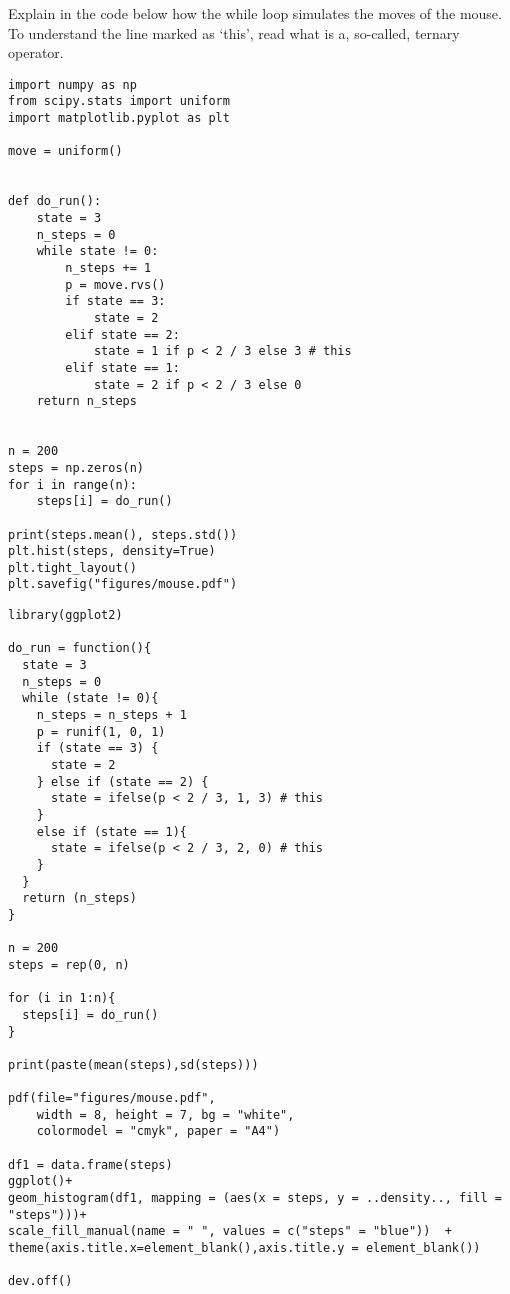 \begin{exercise}
Explain in the code below how the while loop simulates the moves of the mouse.  To understand the line marked as `this', read what is a, so-called, ternary operator.
\begin{verbatim}
import numpy as np
from scipy.stats import uniform
import matplotlib.pyplot as plt

move = uniform()


def do_run():
    state = 3
    n_steps = 0
    while state != 0:
        n_steps += 1
        p = move.rvs()
        if state == 3:
            state = 2
        elif state == 2:
            state = 1 if p < 2 / 3 else 3 # this
        elif state == 1:
            state = 2 if p < 2 / 3 else 0
    return n_steps


n = 200
steps = np.zeros(n)
for i in range(n):
    steps[i] = do_run()

print(steps.mean(), steps.std())
plt.hist(steps, density=True)
plt.tight_layout()
plt.savefig("figures/mouse.pdf")
\end{verbatim}

\begin{verbatim}
library(ggplot2)

do_run = function(){
  state = 3
  n_steps = 0
  while (state != 0){
    n_steps = n_steps + 1
    p = runif(1, 0, 1)
    if (state == 3) {
      state = 2
    } else if (state == 2) {
      state = ifelse(p < 2 / 3, 1, 3) # this
    }
    else if (state == 1){
      state = ifelse(p < 2 / 3, 2, 0) # this
    }
  }
  return (n_steps)
}

n = 200
steps = rep(0, n)

for (i in 1:n){
  steps[i] = do_run()
}

print(paste(mean(steps),sd(steps)))

pdf(file="figures/mouse.pdf",
    width = 8, height = 7, bg = "white",
    colormodel = "cmyk", paper = "A4")

df1 = data.frame(steps)
ggplot()+
geom_histogram(df1, mapping = (aes(x = steps, y = ..density.., fill = "steps")))+
scale_fill_manual(name = " ", values = c("steps" = "blue"))  +
theme(axis.title.x=element_blank(),axis.title.y = element_blank())

dev.off()
\end{verbatim}

\end{exercise}
